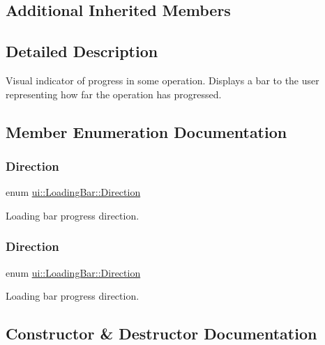 \subsection*{Additional Inherited Members}


\subsection{Detailed Description}
Visual indicator of progress in some operation. Displays a bar to the user representing how far the operation has progressed. 

\subsection{Member Enumeration Documentation}
\mbox{\label{classui_1_1LoadingBar_a4407b3ce72891a78755e25d765e25063}} 
\subsubsection{\texorpdfstring{Direction}{Direction}\hspace{0.1cm}{\footnotesize\ttfamily [1/2]}}
{\footnotesize\ttfamily enum \hyperlink{classui_1_1LoadingBar_a4407b3ce72891a78755e25d765e25063}{ui\+::\+Loading\+Bar\+::\+Direction}\hspace{0.3cm}{\ttfamily [strong]}}

Loading bar progress direction. \mbox{\label{classui_1_1LoadingBar_a4407b3ce72891a78755e25d765e25063}} 
\subsubsection{\texorpdfstring{Direction}{Direction}\hspace{0.1cm}{\footnotesize\ttfamily [2/2]}}
{\footnotesize\ttfamily enum \hyperlink{classui_1_1LoadingBar_a4407b3ce72891a78755e25d765e25063}{ui\+::\+Loading\+Bar\+::\+Direction}\hspace{0.3cm}{\ttfamily [strong]}}

Loading bar progress direction. 

\subsection{Constructor \& Destructor Documentation}
\mbox{\label{classui_1_1LoadingBar_a2cb2c133940150cd97088ef50596ce2d}} 
